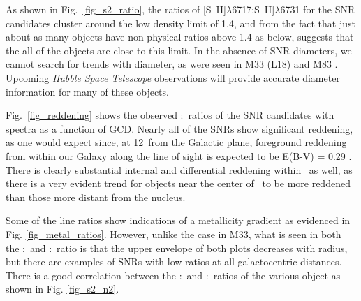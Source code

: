 As shown in Fig.\ \ref{fig_s2_ratio}, the ratios of [S~II]$\lambda$6717:S~II]$\lambda$6731 for the SNR candidates cluster around the low density limit of 1.4, and from the fact that just about as many objects have non-physical ratios above 1.4 as below, suggests that the all of the objects are close to this limit.  In the absence of SNR diameters, we cannot search for trends with diameter, as were seen in M33 (L18) and M83 \citep{winkler17}. Upcoming {\it Hubble Space Telescope} observations will provide accurate diameter information for many of these objects.

Fig.\ \ref{fig_reddening} shows the observed \hb:\ha\ ratios of the SNR candidates with spectra as a function of GCD. Nearly all of the SNRs show significant reddening, as one would expect since, at 12\degr\ from the Galactic plane, foreground reddening from within our Galaxy along the line of sight is expected to be E(B-V) = 0.29 \citep{schlafly11}.  There is clearly substantial internal and differential reddening  within \gal\ as well, as there is a very evident trend for objects near the center of \gal\ to be more reddened than those more distant from the nucleus.


Some of the line ratios show indications of a metallicity gradient as evidenced in Fig. \ref{fig_metal_ratios}.  However, unlike the case in M33, what is seen in both the \nii:\ha\ and \sii:\ha\ ratio is that the upper envelope of both plots decreases with radius, but there are examples of SNRs with low ratios at all galactocentric distances.   There is a good correlation between the \nii:\ha\ and \sii:\ha\ ratios of the various object as shown in Fig. \ref{fig_s2_n2}.





